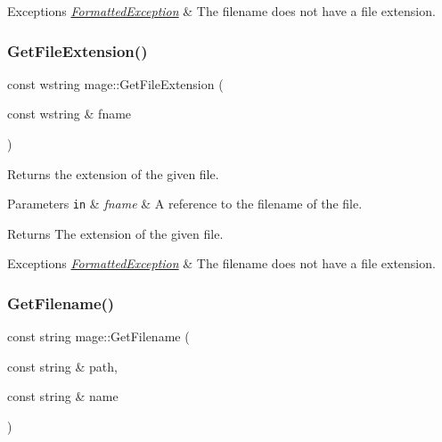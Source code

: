 \begin{DoxyExceptions}{Exceptions}
{\em \hyperlink{structmage_1_1_formatted_exception}{Formatted\+Exception}} & The filename does not have a file extension. \\
\hline
\end{DoxyExceptions}
\hypertarget{namespacemage_a2818c96634f4c8d49dcc4144395b24ef}{}\label{namespacemage_a2818c96634f4c8d49dcc4144395b24ef} 
\subsubsection{\texorpdfstring{Get\+File\+Extension()}{GetFileExtension()}\hspace{0.1cm}{\footnotesize\ttfamily [2/2]}}
{\footnotesize\ttfamily const wstring mage\+::\+Get\+File\+Extension (\begin{DoxyParamCaption}\item[{const wstring \&}]{fname }\end{DoxyParamCaption})}

Returns the extension of the given file.


\begin{DoxyParams}[1]{Parameters}
\mbox{\tt in}  & {\em fname} & A reference to the filename of the file. \\
\hline
\end{DoxyParams}
\begin{DoxyReturn}{Returns}
The extension of the given file. 
\end{DoxyReturn}

\begin{DoxyExceptions}{Exceptions}
{\em \hyperlink{structmage_1_1_formatted_exception}{Formatted\+Exception}} & The filename does not have a file extension. \\
\hline
\end{DoxyExceptions}
\hypertarget{namespacemage_aa85467b1af6c9f14e93178cbfd6ca022}{}\label{namespacemage_aa85467b1af6c9f14e93178cbfd6ca022} 
\subsubsection{\texorpdfstring{Get\+Filename()}{GetFilename()}\hspace{0.1cm}{\footnotesize\ttfamily [1/2]}}
{\footnotesize\ttfamily const string mage\+::\+Get\+Filename (\begin{DoxyParamCaption}\item[{const string \&}]{path,  }\item[{const string \&}]{name }\end{DoxyParamCaption})}


